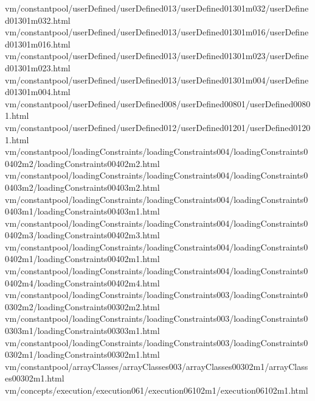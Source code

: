 vm/constantpool/userDefined/userDefined013/userDefined01301m032/userDefined01301m032.html
vm/constantpool/userDefined/userDefined013/userDefined01301m016/userDefined01301m016.html
vm/constantpool/userDefined/userDefined013/userDefined01301m023/userDefined01301m023.html
vm/constantpool/userDefined/userDefined013/userDefined01301m004/userDefined01301m004.html
vm/constantpool/userDefined/userDefined008/userDefined00801/userDefined00801.html
vm/constantpool/userDefined/userDefined012/userDefined01201/userDefined01201.html
vm/constantpool/loadingConstraints/loadingConstraints004/loadingConstraints00402m2/loadingConstraints00402m2.html
vm/constantpool/loadingConstraints/loadingConstraints004/loadingConstraints00403m2/loadingConstraints00403m2.html
vm/constantpool/loadingConstraints/loadingConstraints004/loadingConstraints00403m1/loadingConstraints00403m1.html
vm/constantpool/loadingConstraints/loadingConstraints004/loadingConstraints00402m3/loadingConstraints00402m3.html
vm/constantpool/loadingConstraints/loadingConstraints004/loadingConstraints00402m1/loadingConstraints00402m1.html
vm/constantpool/loadingConstraints/loadingConstraints004/loadingConstraints00402m4/loadingConstraints00402m4.html
vm/constantpool/loadingConstraints/loadingConstraints003/loadingConstraints00302m2/loadingConstraints00302m2.html
vm/constantpool/loadingConstraints/loadingConstraints003/loadingConstraints00303m1/loadingConstraints00303m1.html
vm/constantpool/loadingConstraints/loadingConstraints003/loadingConstraints00302m1/loadingConstraints00302m1.html
vm/constantpool/arrayClasses/arrayClasses003/arrayClasses00302m1/arrayClasses00302m1.html
vm/concepts/execution/execution061/execution06102m1/execution06102m1.html



